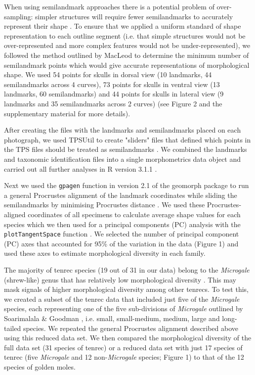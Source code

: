 \documentclass[12pt,a4paper]{article}
\begin{document}
	When using semilandmark approaches there is a potential problem of over-sampling: simpler structures will require fewer semilandmarks to accurately represent their shape \citep{MacLeod2012}. To ensure that we applied a uniform standard of shape representation to each outline segment (i.e. that simple structures would not be over-represented and more complex features would not be under-represented), we followed the method outlined by MacLeod \citeyearpar{MacLeod2012} to determine the minimum number of semilandmark points which would give accurate representations of morphological shape. We used 54 points for skulls in dorsal view (10 landmarks, 44 semilandmarks across 4 curves), 73 points for skulls in ventral view (13 landmarks, 60 semilandmarks) and 44 points for skulls in lateral view (9 landmarks and 35 semilandmarks across 2 curves) (see Figure 2 and the supplementary material for more details).
	
	After creating the files with the landmarks and semilandmarks placed on each photograph, we used TPSUtil \citep{Rohlf2012} to create "sliders" files that defined which points in the TPS files should be treated as semilandmarks \citep{Zelditch2012}. We combined the landmarks and taxonomic identification files into a single morphometrics data object and carried out all further analyses in R version 3.1.1 \citep{Team2014}. 
	
	Next we used the \texttt{gpagen} function in version 2.1 of the geomorph package \citep{Adams2014a, Adams2013} to run a general Procrustes alignment \citep{Rohlf1993} of the landmark coordinates while sliding the semilandmarks by minimising Procrustes distance \citep{Bookstein1997}. We used these Procrustes-aligned coordinates of all specimens to calculate average shape values for each species which we then used for a principal components (PC) analysis with the \texttt{plotTangentSpace} function \citep{Adams2013}. We selected the number of principal component (PC) axes that accounted for 95\% of the variation in the data (Figure 1) and used these axes to estimate morphological diversity in each family. 

 	The majority of tenrec species (19 out of 31 in our data) belong to the \textit{Microgale} (shrew-like) genus that has relatively low morphological diversity \citep{Soarimalala2011, Jenkins2003}. This may mask signals of higher morphological diversity among other tenrecs. To test this, we created a subset of the tenrec data that included just five of the \textit{Microgale} species, each representing one of the five sub-divisions of \textit{Microgale} outlined by Soarimalala \& Goodman \citeyearpar{Soarimalala2011}, i.e. small, small-medium, medium, large and long-tailed species. We repeated the general Procrustes alignment described above using this reduced data set. We then compared the morphological diversity of the full data set (31 species of tenrec) or a reduced data set with just 17 species of tenrec (five \textit{Microgale} and 12 non-\textit{Microgale} species; Figure 1) to that of the 12 species of golden moles.
	
\end{document}
